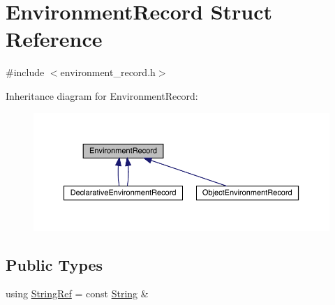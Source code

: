 \hypertarget{struct_environment_record}{}\section{Environment\+Record Struct Reference}
\label{struct_environment_record}


{\ttfamily \#include $<$environment\+\_\+record.\+h$>$}



Inheritance diagram for Environment\+Record\+:
\nopagebreak
\begin{figure}[H]
\begin{center}
\leavevmode
\includegraphics[width=350pt]{struct_environment_record__inherit__graph}
\end{center}
\end{figure}
\subsection*{Public Types}
\begin{DoxyCompactItemize}
\item 
using \hyperlink{struct_environment_record_ab67bd5dbacae338473147ec3f753a364}{String\+Ref} = const \hyperlink{struct_string}{String} \&
\end{DoxyCompactItemize}
